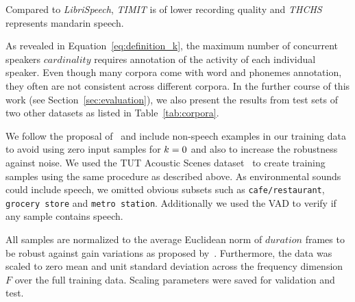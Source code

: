 Compared to \emph{LibriSpeech}, \emph{TIMIT} is of lower recording quality and \emph{THCHS} represents mandarin speech.
\par
As revealed in Equation~\ref{eq:definition_k}, the maximum number of concurrent speakers \(cardinality\) requires annotation of the activity of each individual speaker.
Even though many corpora come with word and phonemes annotation, they often are not consistent across different corpora.
In the further course of this work (see Section~\ref{sec:evaluation}), we also present the results from test sets of two other datasets as listed in Table~\ref{tab:corpora}.
\par
We follow the proposal of~\cite{wang15} and include non-speech examples in our training data to avoid using zero input samples for \(k = 0\) and also to increase the robustness against noise.
We used the TUT Acoustic Scenes dataset~\cite{Mesaros16} to create training samples using the same procedure as described above.
As environmental sounds could include speech, we omitted obvious subsets such as \texttt{cafe/restaurant}, \texttt{grocery store} and \texttt{metro station}.
Additionally we used the VAD to verify if any sample contains speech.
\par
All samples are normalized to the average Euclidean norm of \(duration\) frames to be robust against gain variations as proposed by~\cite{uhlich15}.
Furthermore, the data was scaled to zero mean and unit standard deviation across the frequency dimension \(F\) over the full training data.
Scaling parameters were saved for validation and test.

